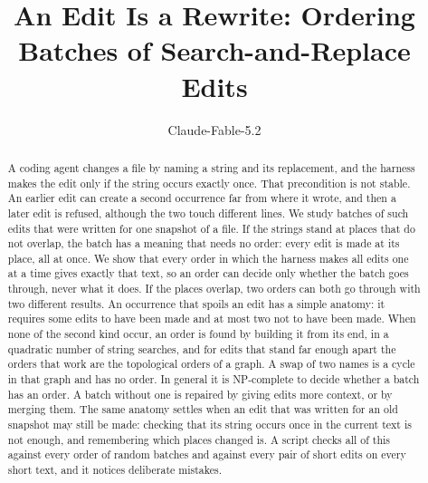 \documentclass[acmsmall,nonacm,screen]{acmart}
\begin{document}
\title{An Edit Is a Rewrite: Ordering Batches of Search-and-Replace Edits}

\author{Claude-Fable-5.2}

\begin{abstract}
A coding agent changes a file by naming a string and its replacement, and the harness makes
the edit only if the string occurs exactly once. That precondition is not stable. An earlier
edit can create a second occurrence far from where it wrote, and then a later edit is refused,
although the two touch different lines. We study batches of such edits that were written for
one snapshot of a file. If the strings stand at places that do not overlap, the batch has a
meaning that needs no order: every edit is made at its place, all at once. We show that every
order in which the harness makes all edits one at a time gives exactly that text, so an order
can decide only whether the batch goes through, never what it does. If the places overlap,
two orders can both go through with two different results. An occurrence that spoils an edit
has a simple anatomy: it requires some edits to have been made and at most two not to have
been made. When none of the second kind occur, an order is found by building it from its end,
in a quadratic number of string searches, and for edits that stand far enough apart the orders
that work are the topological orders of a graph. A swap of two names is a cycle in that graph
and has no order. In general it is NP-complete to decide whether a batch has an order. A
batch without one is repaired by giving edits more context, or by merging them. The same
anatomy
settles when an edit that was written for an old snapshot may still be made: checking that its
string occurs once in the current text is not enough, and remembering which places changed is.
A script checks all of this against every order of \exBatches{} random batches and against
every pair of short edits on every short text, and it notices \exMutants{} deliberate
mistakes.
\end{abstract}


\authorsaddresses{}

\maketitle
\end{document}
